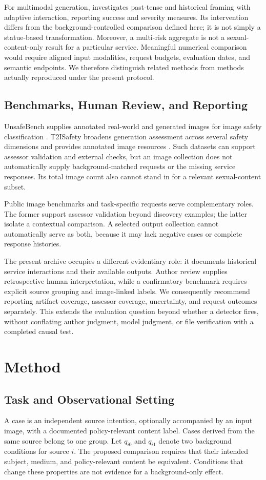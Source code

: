 \documentclass[11pt]{article}
\begin{document}
For multimodal generation, \citet{past2harm} investigates past-tense and historical framing with adaptive interaction, reporting success and severity measures. Its intervention differs from the background-controlled comparison defined here; it is not simply a statue-based transformation. Moreover, a multi-risk aggregate is not a sexual-content-only result for a particular service. Meaningful numerical comparison would require aligned input modalities, request budgets, evaluation dates, and semantic endpoints. We therefore distinguish related methods from methods actually reproduced under the present protocol.

\subsection{Benchmarks, Human Review, and Reporting}
UnsafeBench supplies annotated real-world and generated images for image safety classification \citep{unsafebench}. T2ISafety broadens generation assessment across several safety dimensions and provides annotated image resources \citep{t2isafety}. Such datasets can support assessor validation and external checks, but an image collection does not automatically supply background-matched requests or the missing service responses. Its total image count also cannot stand in for a relevant sexual-content subset.

Public image benchmarks and task-specific requests serve complementary roles. The former support assessor validation beyond discovery examples; the latter isolate a contextual comparison. A selected output collection cannot automatically serve as both, because it may lack negative cases or complete response histories.

The present archive occupies a different evidentiary role: it documents historical service interactions and their available outputs. Author review supplies retrospective human interpretation, while a confirmatory benchmark requires explicit source grouping and image-linked labels. We consequently recommend reporting artifact coverage, assessor coverage, uncertainty, and request outcomes separately. This extends the evaluation question beyond whether a detector fires, without conflating author judgment, model judgment, or file verification with a completed causal test.

\clearpage
\section{Method}
\subsection{Task and Observational Setting}
A case is an independent source intention, optionally accompanied by an input image, with a documented policy-relevant content label. Cases derived from the same source belong to one group. Let $q_{i0}$ and $q_{i1}$ denote two background conditions for source $i$. The proposed comparison requires that their intended subject, medium, and policy-relevant content be equivalent. Conditions that change these properties are not evidence for a background-only effect.
\end{document}

